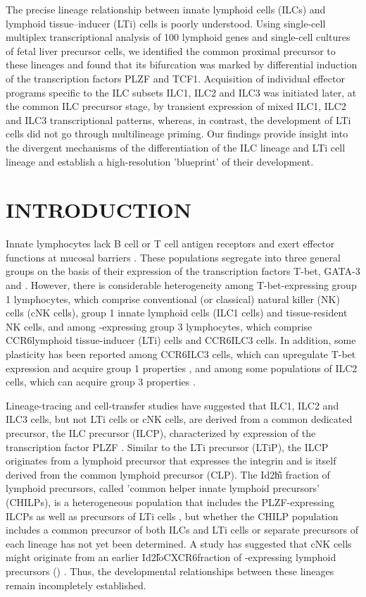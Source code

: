 The precise lineage relationship between innate lymphoid cells (ILCs) and lymphoid tissue–inducer (LTi) cells is poorly understood. Using single-cell multiplex transcriptional analysis of 100 lymphoid genes and single-cell cultures of fetal liver precursor cells, we identified the common proximal precursor to these lineages and found that its bifurcation was marked by differential induction of the transcription factors PLZF and TCF1. Acquisition of individual effector programs specific to the ILC subsets ILC1, ILC2 and ILC3 was initiated later, at the common ILC precursor stage, by transient expression of mixed ILC1, ILC2 and ILC3 transcriptional patterns, whereas, in contrast, the development of LTi cells did not go through multilineage priming. Our findings provide insight into the divergent mechanisms of the differentiation of the ILC lineage and LTi cell lineage and establish a high-resolution 'blueprint' of their development.

\section{INTRODUCTION}

Innate lymphocytes lack B cell or T cell antigen receptors and exert effector functions at mucosal barriers \cite{diefenbach2014,serafini2015}. These populations segregate into three general groups on the basis of their expression of the transcription factors T-bet, GATA-3 and \RORgt. However, there is considerable heterogeneity among T-bet-expressing group 1 lymphocytes, which comprise conventional (or classical) natural killer (NK) cells (cNK cells), group 1 innate lymphoid cells (ILC1 cells) and tissue-resident NK cells, and among \RORgt-expressing group 3 lymphocytes, which comprise CCR6\UP lymphoid tissue-inducer (LTi) cells and CCR6\UM ILC3 cells. In addition, some plasticity has been reported among CCR6\UM ILC3 cells, which can upregulate T-bet expression and acquire group 1 properties \cite{klose2013}, and among some populations of ILC2 cells, which can acquire group 3 properties \cite{huang2015}.

Lineage-tracing and cell-transfer studies have suggested that ILC1, ILC2 and ILC3 cells, but not LTi cells or cNK cells, are derived from a common dedicated precursor, the ILC precursor (ILCP), characterized by expression of the transcription factor PLZF \cite{constantinides2014}. Similar to the LTi precursor (LTiP), the ILCP originates from a lymphoid precursor that expresses the integrin \ab{} and is itself derived from the common lymphoid precursor (CLP). The Id2\U{hi} fraction of \ab\UP lymphoid precursors, called 'common helper innate lymphoid precursors' (CHILPs), is a heterogeneous population that includes the PLZF-expressing ILCPs as well as precursors of LTi cells \cite{klose2014}, but whether the CHILP population includes a common precursor of both ILCs and LTi cells or separate precursors of each lineage has not yet been determined. A study has suggested that cNK cells might originate from an earlier Id2\U{lo}CXCR6\UP fraction of \ab-expressing lymphoid precursors (\aLPs) \cite{yu2014}. Thus, the developmental relationships between these lineages remain incompletely established.

